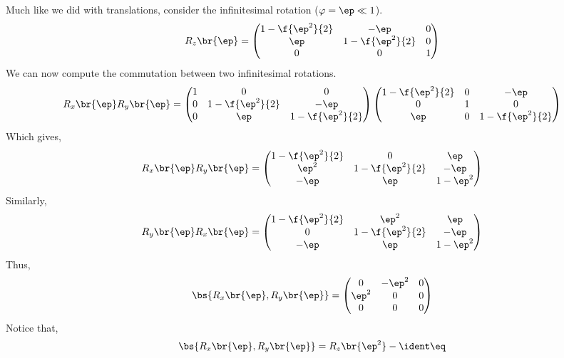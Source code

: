 \documentclass{article}
\begin{document}
Much like we did with translations, consider the infinitesimal rotation ($\varphi = \ep \ll 1$).
\[ R_{z}\br{\ep} = \begin{pmatrix}
    1 - \f{\ep^2}{2} & - \ep & 0 \\
    \ep & 1 - \f{\ep^2}{2} & 0 \\
    0 & 0 & 1 \\
\end{pmatrix} \]
We can now compute the commutation between two infinitesimal rotations.
\[ R_{x}\br{\ep}R_{y}\br{\ep} = \begin{pmatrix}
    1 & 0 & 0 \\
    0 & 1 - \f{\ep^2}{2} & - \ep \\
    0 & \ep & 1 - \f{\ep^2}{2} \\
\end{pmatrix}\begin{pmatrix}
    1 - \f{\ep^2}{2} & 0 & - \ep \\
    0 & 1 & 0 \\
    \ep & 0 & 1 - \f{\ep^2}{2} \\
\end{pmatrix} \]
Which gives,
\[ R_{x}\br{\ep}R_{y}\br{\ep} = \begin{pmatrix}
    1 - \f{\ep^2}{2} & 0 & \ep \\
    \ep^2 & 1 - \f{\ep^2}{2} & -\ep \\
    -\ep & \ep & 1 - \ep^2 \\
\end{pmatrix} \]
Similarly,
\[ R_{y}\br{\ep}R_{x}\br{\ep} = \begin{pmatrix}
    1 - \f{\ep^2}{2} & \ep^2 & \ep \\
    0 & 1 - \f{\ep^2}{2} & -\ep \\
    -\ep & \ep & 1 - \ep^2 \\
\end{pmatrix} \]
Thus,
\[ \bs{R_{x}\br{\ep}, R_{y}\br{\ep}} = \begin{pmatrix}
    0 & -\ep^2 & 0 \\
    \ep^2 & 0 & 0 \\
    0 & 0 & 0 \\
\end{pmatrix} \]
Notice that,
\[ \bs{R_{x}\br{\ep}, R_{y}\br{\ep}} = R_{z}\br{\ep^2} - \ident \eq \label{eq:rotation_infinitesimal} \]
\end{document}
